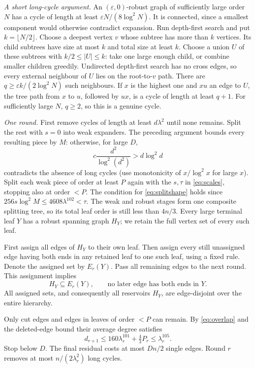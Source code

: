 \documentclass[11pt]{article}
\theoremstyle{remark}\newtheorem*{remark}{Remark}
\newcommand{\eps}{\varepsilon}
\begin{document}
\emph{A short long-cycle argument.}
An $(\eps,0)$-robust graph of sufficiently large order $N$ has a cycle
of length at least $\eps N/(8\log^2N)$. It is connected, since a
smallest component would otherwise contradict expansion.
Run depth-first search and put $k=\lfloor N/2\rfloor$. Choose a deepest
vertex $v$ whose subtree has more than $k$ vertices. Its child subtrees
have size at most $k$ and total size at least $k$. Choose a union $U$
of these subtrees with $k/2\le|U|\le k$: take one large enough child,
or combine smaller children greedily. Undirected depth-first search
has no cross edges, so every external neighbour of $U$ lies on the
root-to-$v$ path. There are $q\ge\eps k/(2\log^2N)$ such neighbours.
If $x$ is the highest one and $xu$ an edge to $U$, the tree path from
$x$ to $u$, followed by $ux$, is a cycle of length at least $q+1$.
For sufficiently large $N$, $q\ge2$, so this is a genuine cycle.

\emph{One round.}
First remove cycles of length at least $d\lambda^2$ until none remains.
Split the rest with $s=0$ into weak expanders. The preceding argument
bounds every resulting piece by $M$: otherwise, for large $D$,
\[
 c\frac{d^2}{\log^2(d^2)}>d\log^2d
\]
contradicts the absence of long cycles (use monotonicity of
$x/\log^2x$ for large $x$). Split each weak piece of order at least $P$
again with the $s,\tau$ in \eqref{eq:scales}, stopping also at order $<P$.
The condition for \eqref{eq:splitshape} holds since
$256s\log^2M\le4608\lambda^{102}<\tau$.
The weak and robust stages form one composite splitting tree, so its
total leaf order is still less than $4n/3$.
Every large terminal leaf $Y$ has a robust spanning graph $H_Y$;
we retain the full vertex set of every such leaf.

First assign all edges of $H_Y$ to their own leaf. Then assign every
still unassigned edge having both ends in any retained leaf to one such
leaf, using a fixed rule. Denote the assigned set by $E_r(Y)$.
Pass all remaining edges to the next round. This assignment implies
\begin{equation}\label{eq:separation}
 H_Y\subseteq E_r(Y),\qquad
 \text{no later edge has both ends in }Y.
\end{equation}
All assigned sets, and consequently all reservoirs $H_Y$, are
edge-disjoint over the entire hierarchy.

Only cut edges and edges in leaves of order $<P$ can remain. By
\eqref{eq:overlap} and the deleted-edge bound their average degree satisfies
\begin{equation}\label{eq:recursion}
 d_{r+1}\le160\lambda_r^{101}+\tfrac43P_r\le\lambda_r^{105}.
\end{equation}
Stop below $D$. The final residual costs at most $Dn/2$ single edges.
Round $r$ removes at most $n/(2\lambda_r^2)$ long cycles.
\end{document}
